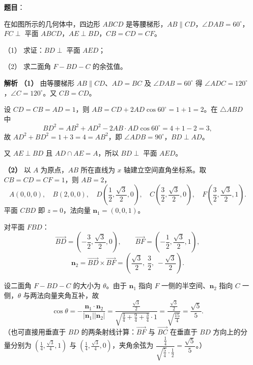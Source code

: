 \begin{answer}

\textbf{题目}：

在如图所示的几何体中，四边形 $ABCD$ 是等腰梯形，$AB\parallel CD$，$\angle DAB=60^\circ$，$FC\perp$ 平面 $ABCD$，$AE\perp BD$，$CB=CD=CF$。

（1） 求证：$BD\perp$ 平面 $AED$；

（2） 求二面角 $F-BD-C$ 的余弦值。
\nopagebreak[4]
\begin{center}\end{center}
\nopagebreak[4]
\textbf{解析}
\textbf{（1）} 由等腰梯形 $AB\parallel CD$、$AD=BC$ 及 $\angle DAB=60^\circ$ 得 $\angle ADC=120^\circ$，$\angle C=120^\circ$。又 $CB=CD$。

设 $CD=CB=AD=1$，则 $AB=CD+2AD\cos60^\circ=1+1=2$。在 $\triangle ABD$ 中
\nopagebreak[4]
\[BD^2=AB^2+AD^2-2AB\cdot AD\cos60^\circ=4+1-2=3,\]
故 $AD^2+BD^2=1+3=4=AB^2$，即 $\angle ADB=90^\circ$，$BD\perp AD$。

又 $AE\perp BD$ 且 $AD\cap AE=A$，所以 $BD\perp$ 平面 $AED$。

\textbf{（2）} 以 $A$ 为原点，$AB$ 所在直线为 $x$ 轴建立空间直角坐标系。取 $CB=CD=CF=1$，则 $AB=2$，
\nopagebreak[4]
\[A(0,0,0),\quad B(2,0,0),\quad D\left(\frac12,\frac{\sqrt3}2,0\right),\quad C\left(\frac32,\frac{\sqrt3}2,0\right),\quad F\left(\frac32,\frac{\sqrt3}2,1\right).\]
平面 $CBD$ 即 $z=0$，法向量 $\boldsymbol n_1=(0,0,1)$。

对平面 $FBD$：
\nopagebreak[4]
\[\overrightarrow{BD}=\left(-\frac32,\frac{\sqrt3}2,0\right),\qquad \overrightarrow{BF}=\left(-\frac12,\frac{\sqrt3}2,1\right),\]
\nopagebreak[4]
\[\boldsymbol n_2=\overrightarrow{BD}\times\overrightarrow{BF}=\left(\frac{\sqrt3}2,\ \frac32,\ -\frac{\sqrt3}2\right).\]

设二面角 $F-BD-C$ 的大小为 $\theta$。由于 $\boldsymbol n_1$ 指向 $F$ 一侧的半空间、$\boldsymbol n_2$ 指向 $C$ 一侧，$\theta$ 与两法向量夹角互补，故
\nopagebreak[4]
\[\cos\theta=-\frac{\boldsymbol n_1\cdot\boldsymbol n_2}{|\boldsymbol n_1||\boldsymbol n_2|}=\frac{\frac{\sqrt3}2}{\sqrt{\frac34+\frac94+\frac34}\cdot1}=\frac{\frac{\sqrt3}2}{\sqrt{\frac{15}4}}=\frac{\sqrt5}5.\]
（也可直接用垂直于 $BD$ 的两条射线计算：$\overrightarrow{BF}$ 与 $\overrightarrow{BC}$ 在垂直于 $BD$ 方向上的分量分别为 $\left(\frac14,\frac{\sqrt3}4,1\right)$ 与 $\left(\frac14,\frac{\sqrt3}4,0\right)$，夹角余弦为 $\dfrac{\frac14}{\sqrt{\frac54}\cdot\frac12}=\dfrac{\sqrt5}5$。）



\end{answer}
